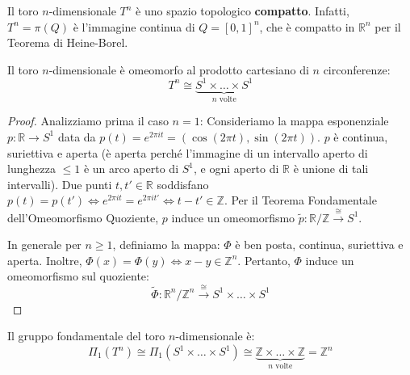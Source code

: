 \begin{coro}
Il toro $n$-dimensionale $T^n$ è uno spazio topologico \textbf{compatto}.
Infatti, $T^n = \pi(Q)$ è l'immagine continua di $Q = [0,1]^n$, che è compatto in $\mathbb{R}^n$ per il Teorema di Heine-Borel.
\end{coro}

\vspace{1.5em}

\begin{teo}
Il toro $n$-dimensionale è omeomorfo al prodotto cartesiano di $n$ circonferenze:
\[
T^n \cong \underbrace{S^1 \times \dots \times S^1}_{n \text{ volte}}
\]
\end{teo}

\begin{proof}
Analizziamo prima il caso $n = 1$:
Consideriamo la mappa esponenziale $p: \mathbb{R} \to S^1$ data da $p(t) = e^{2\pi i t} = (\cos(2\pi t), \sin(2\pi t))$.
$p$ è continua, suriettiva e aperta (\`e aperta perch\'e l'immagine di un intervallo aperto di lunghezza $\leqslant 1$ \`e un arco aperto di $S^1$, e ogni aperto di $\mathbb{R}$ \`e unione di tali intervalli).
Due punti $t, t' \in \mathbb{R}$ soddisfano $p(t) = p(t') \iff e^{2\pi i t} = e^{2\pi i t'} \iff t - t' \in \mathbb{Z}$.
Per il Teorema Fondamentale dell'Omeomorfismo Quoziente, $p$ induce un omeomorfismo $\tilde{p}: \mathbb{R}/\mathbb{Z} \xrightarrow{\cong} S^1$.

In generale per $n \geqslant 1$, definiamo la mappa:
$\Phi$ è ben posta, continua, suriettiva e aperta.
Inoltre, $\Phi(x) = \Phi(y) \iff x - y \in \mathbb{Z}^n$.
Pertanto, $\Phi$ induce un omeomorfismo sul quoziente:
\[
\widetilde{\Phi}: \mathbb{R}^n / \mathbb{Z}^n \xrightarrow{\;\cong\;} S^1 \times \dots \times S^1
\]
\end{proof}

\begin{coro}
Il gruppo fondamentale del toro $n$-dimensionale è:
\[
\Pi_1(T^n) \cong \Pi_1(S^1 \times \dots \times S^1) \cong \underbrace{\mathbb{Z} \times \dots \times \mathbb{Z}}_{n \text{ volte}} = \mathbb{Z}^n
\]
\end{coro}

